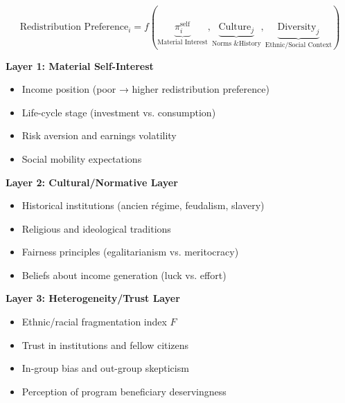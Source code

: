 \begin{tcolorbox}[colback=blue!5!white, colframe=blue!75!black,
    title=Alesina Framework: Three Layers of Preference Formation]

\begin{equation}
\text{Redistribution Preference}_i = f(\underbrace{\pi^{\text{self}}_i}_{\text{Material Interest}},
                                      \underbrace{\text{Culture}_j}_{\text{Norms \& History}},
                                      \underbrace{\text{Diversity}_j}_{\text{Ethnic/Social Context}})
\end{equation}

\textbf{Layer 1: Material Self-Interest}
\begin{itemize}[nosep]
\item Income position (poor → higher redistribution preference)
\item Life-cycle stage (investment vs. consumption)
\item Risk aversion and earnings volatility
\item Social mobility expectations
\end{itemize}

\textbf{Layer 2: Cultural/Normative Layer}
\begin{itemize}[nosep]
\item Historical institutions (ancien régime, feudalism, slavery)
\item Religious and ideological traditions
\item Fairness principles (egalitarianism vs. meritocracy)
\item Beliefs about income generation (luck vs. effort)
\end{itemize}

\textbf{Layer 3: Heterogeneity/Trust Layer}
\begin{itemize}[nosep]
\item Ethnic/racial fragmentation index $F$
\item Trust in institutions and fellow citizens
\item In-group bias and out-group skepticism
\item Perception of program beneficiary deservingness
\end{itemize}

\end{tcolorbox}

\clearpage


